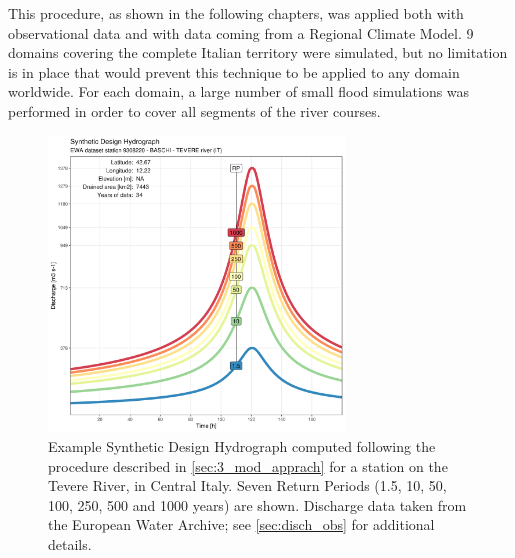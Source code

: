This procedure, as shown in the following chapters, was applied both with observational data and with data coming from a Regional Climate Model. 9 domains covering the complete Italian territory were simulated, but no limitation is in place that would prevent this technique to be applied to any domain worldwide. For each domain, a large number of small flood simulations was performed in order to cover all segments of the river courses.
\begin{figure}
    \centering
    \includegraphics[width=0.7\textwidth]{figures/example_sdh}
    \decoRule
    \caption[Example Synthetic Design Hydrograph]{Example Synthetic Design Hydrograph computed following the procedure described in \cref{sec:3_mod_apprach} for a station on the Tevere River, in Central Italy. Seven Return Periods (1.5, 10, 50, 100, 250, 500 and 1000 years) are shown. Discharge data taken from the European Water Archive; see \cref{sec:disch_obs} for additional details.}
    \label{fig:example_SHD}
\end{figure}
